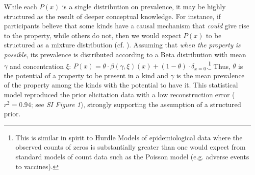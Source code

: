 \documentclass{pnastwo}
\begin{document}
\begin{article}
While each $P(x)$ is a single distribution on prevalence, it may be highly structured as the result of deeper conceptual knowledge. 
For instance, if participants believe that some kinds have a causal mechanism that \emph{could} give rise to the property, while others do not, then we would expect $P(x)$ to be structured as a mixture distribution (cf. \cite{Griffiths2005}).
Assuming that \emph{when the property is possible}, its prevalence is distributed according to a Beta distribution with mean $\gamma$ and concentration $\xi$: 
$P(x)=\theta \cdot \beta(\gamma,\xi)(x) + (1-\theta) \cdot \delta_{x=0}$.\footnote{This is similar in spirit to Hurdle Models of epidemiological data where the observed counts of zeros is substantially greater than one would expect from standard models of count data such as the Poisson model (e.g. adverse events to vaccines)\cite{hurdleModels}.}
Thus, $\theta$ is the potential of a property to be present in a kind and $\gamma$ is the mean prevalence of the property among the kinds with the potential to have it. %
This statistical model reproduced the prior elicitation data with a low reconstruction error ($r^2 = 0.94$; see {\it SI Figure 1}), strongly supporting the assumption of a structured prior. 



\end{article}
\end{document}
